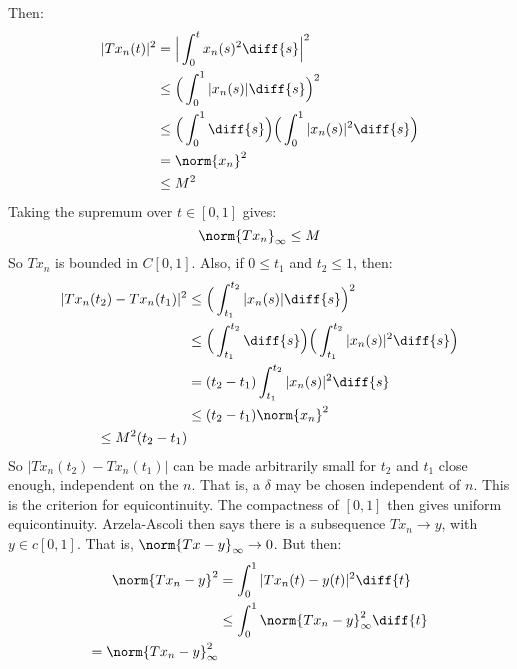         Then:
        \begin{align*}
            |Tx_{n}(t)|^{2}&=
            \Big|\int_{0}^{t}x_{n}(s)^{2}\diff{s}\Big|^{2}\\
            &\leq
            \Big(\int_{0}^{1}|x_{n}(s)|\diff{s}\Big)^{2}\\
            &\leq\Big(\int_{0}^{1}\diff{s}\Big)
            \Big(\int_{0}^{1}|x_{n}(s)|^{2}\diff{s}\Big)\\
            &=\norm{x_{n}}^{2}\\
            &\leq{M}^{2}
        \end{align*}
        Taking the supremum over $t\in[0,1]$ gives:
        \begin{equation*}
            \norm{Tx_{n}}_{\infty}\leq{M}
        \end{equation*}
        So $Tx_{n}$ is bounded in $C[0,1]$. Also, if
        $0\leq{t}_{1}$ and $t_{2}\leq{1}$, then:
        \begin{align*}
            |Tx_{n}(t_{2})-Tx_{n}(t_{1})|^{2}
            &\leq\Big(\int_{t_{1}}^{t_{2}}|x_{n}(s)|
            \diff{s}\Big)^{2}\\
            &\leq\Big(\int_{t_{1}}^{t_{2}}\diff{s}\Big)
            \Big(\int_{t_{1}}^{t_{2}}|x_{n}(s)|^{2}
            \diff{s}\Big)\\
            &=(t_{2}-t_{1})\int_{t_{1}}^{t_{2}}
            |x_{n}(s)|^{2}\diff{s}\\
            &\leq(t_{2}-t_{1})\norm{x_{n}}^{2}\\
            \leq{M}^{2}(t_{2}-t_{1})
        \end{align*}
        So $|Tx_{n}(t_{2})-Tx_{n}(t_{1})|$ can be made
        arbitrarily small for $t_{2}$ and $t_{1}$ close enough,
        independent on the $n$. That is, a
        $\delta$ may be chosen independent of $n$. This is
        the criterion for equicontinuity.
        The compactness of $[0,1]$ then gives uniform
        equicontinuity. Arzela-Ascoli then says there is a
        subsequence $Tx_{n}\rightarrow{y}$,
        with $y\in{c}[0,1]$. That is,
        $\norm{Tx-y}_{\infty}\rightarrow{0}$. But then:
        \begin{align*}
            \norm{Tx_{n}-y}^{2}
            &=\int_{0}^{1}|Tx_{n}(t)-y(t)|^{2}\diff{t}\\
            &\leq\int_{0}^{1}
            \norm{Tx_{n}-y}_{\infty}^{2}\diff{t}\\
            =\norm{Tx_{n}-y}_{\infty}^{2}
        \end{align*}
